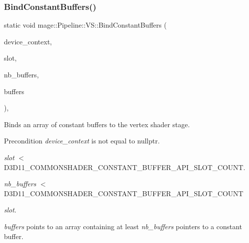 \subsubsection{\texorpdfstring{Bind\+Constant\+Buffers()}{BindConstantBuffers()}}
{\footnotesize\ttfamily static void mage\+::\+Pipeline\+::\+V\+S\+::\+Bind\+Constant\+Buffers (\begin{DoxyParamCaption}\item[{I\+D3\+D11\+Device\+Context2 $\ast$}]{device\+\_\+context,  }\item[{\hyperlink{namespacemage_af2b398bf98eb10351f49cad73fe2cc73}{u32}}]{slot,  }\item[{\hyperlink{namespacemage_af2b398bf98eb10351f49cad73fe2cc73}{u32}}]{nb\+\_\+buffers,  }\item[{I\+D3\+D11\+Buffer $\ast$const $\ast$}]{buffers }\end{DoxyParamCaption})\hspace{0.3cm}{\ttfamily [static]}, {\ttfamily [noexcept]}}

Binds an array of constant buffers to the vertex shader stage.

\begin{DoxyPrecond}{Precondition}
{\itshape device\+\_\+context} is not equal to {\ttfamily nullptr}. 

{\itshape slot} $<$ {\ttfamily D3\+D11\+\_\+\+C\+O\+M\+M\+O\+N\+S\+H\+A\+D\+E\+R\+\_\+\+C\+O\+N\+S\+T\+A\+N\+T\+\_\+\+B\+U\+F\+F\+E\+R\+\_\+\+A\+P\+I\+\_\+\+S\+L\+O\+T\+\_\+\+C\+O\+U\+NT}. 

{\itshape nb\+\_\+buffers} $<$ {\ttfamily D3\+D11\+\_\+\+C\+O\+M\+M\+O\+N\+S\+H\+A\+D\+E\+R\+\_\+\+C\+O\+N\+S\+T\+A\+N\+T\+\_\+\+B\+U\+F\+F\+E\+R\+\_\+\+A\+P\+I\+\_\+\+S\+L\+O\+T\+\_\+\+C\+O\+U\+NT} 
\begin{DoxyItemize}
\item {\itshape slot}. 
\end{DoxyItemize}

{\itshape buffers} points to an array containing at least {\itshape nb\+\_\+buffers} pointers to a constant buffer. 
\end{DoxyPrecond}

